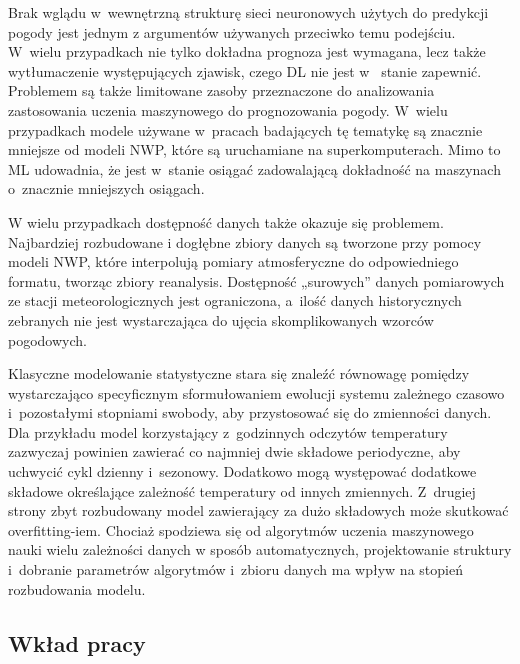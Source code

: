 Brak wglądu w~wewnętrzną strukturę sieci neuronowych użytych do predykcji pogody jest jednym
z argumentów używanych przeciwko temu podejściu. W~wielu przypadkach nie tylko dokładna
prognoza jest wymagana, lecz także wytłumaczenie występujących zjawisk, czego DL nie jest w~
stanie zapewnić. Problemem są także limitowane zasoby przeznaczone do analizowania zastosowania
uczenia maszynowego do prognozowania pogody. W~wielu przypadkach modele używane w~pracach
badających tę tematykę są znacznie mniejsze od modeli NWP, które są uruchamiane na superkomputerach.
Mimo to ML udowadnia, że jest w~stanie osiągać zadowalającą dokładność na maszynach o~znacznie
mniejszych osiągach.

W wielu przypadkach dostępność danych także okazuje się problemem. Najbardziej rozbudowane 
i dogłębne zbiory danych są tworzone przy pomocy modeli NWP, które interpolują pomiary atmosferyczne
do odpowiedniego formatu, tworząc zbiory reanalysis. Dostępność „surowych'' danych pomiarowych 
ze stacji meteorologicznych
jest ograniczona, a~ilość danych historycznych zebranych nie jest wystarczająca do ujęcia 
skomplikowanych wzorców pogodowych.

Klasyczne modelowanie statystyczne stara się znaleźć równowagę pomiędzy wystarczająco specyficznym
sformułowaniem ewolucji systemu zależnego czasowo i~pozostałymi stopniami swobody, aby 
przystosować się do zmienności danych\cite{can-dl-beat-numerical}. Dla przykładu 
model korzystający z~godzinnych odczytów temperatury zazwyczaj powinien zawierać co najmniej
dwie składowe periodyczne, aby uchwycić cykl dzienny i~sezonowy. Dodatkowo mogą występować
dodatkowe składowe określające zależność temperatury od innych zmiennych. Z~drugiej strony
zbyt rozbudowany model zawierający za dużo składowych może skutkować overfitting-iem.
Chociaż spodziewa się od algorytmów uczenia maszynowego nauki wielu zależności danych
w sposób automatycznych, projektowanie struktury i~dobranie parametrów algorytmów i~zbioru danych ma wpływ na stopień rozbudowania modelu.

\subsection{Wkład pracy}

